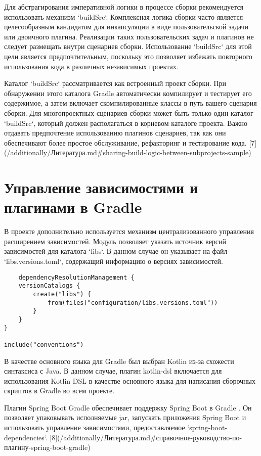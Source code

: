 Для абстрагирования императивной логики в процессе сборки рекомендуется использовать
механизм `buildSrc`.
Комплексная логика сборки часто является целесообразным кандидатом для
инкапсуляции в виде пользовательской задачи или двоичного плагина.
Реализации таких пользовательских
задач и плагинов не следует размещать внутри сценариев сборки.
Использование `buildSrc` для этой
цели является предпочтительным, поскольку это позволяет избежать повторного использования кода в
различных независимых проектах.

Каталог `buildSrc` рассматривается как встроенный проект сборки.
При обнаружении этого каталога
Gradle автоматически компилирует и тестирует его содержимое, а затем включает скомпилированные
классы в путь вашего сценария сборки.
Для многопроектных сценариев сборки может быть только один
каталог `buildSrc`, который должен располагаться в корневом каталоге проекта.
Важно отдавать
предпочтение использованию плагинов сценариев, так как они обеспечивают более простое обслуживание,
рефакторинг и тестирование
кода.
[7](/additionally/Литература.md\#sharing-build-logic-between-subprojects-sample)


\section{Управление зависимостями и плагинами в Gradle}

В проекте дополнительно используется механизм централизованного управления расширением зависимостей.
Модуль позволяет указать источник версий зависимостей для каталога `libs`.
В данном случае он
указывает на файл `libs.versions.toml`,
содержащий информацию о версиях зависимостей.

\begin{lstlisting}
    dependencyResolutionManagement {
    versionCatalogs {
        create("libs") {
            from(files("configuration/libs.versions.toml"))
        }
    }
}

include("conventions")
\end{lstlisting}


В качестве основного языка для Gradle был выбран Kotlin из-за схожести синтаксиса с Java.
В данном случае, плагин kotlin-dsl включается для использования Kotlin DSL в качестве основного
языка для написания сборочных скриптов в Gradle во всем проекте.

Плагин Spring Boot Gradle обеспечивает поддержку Spring Boot в Gradle .
Он позволяет упаковывать
исполняемые jar, запускать приложения Spring Boot и использовать управление
зависимостями,
предоставляемое `spring-boot-dependencies`.
[8](/additionally/Литература.md\#справочное-руководство-по-плагину-spring-boot-gradle)

